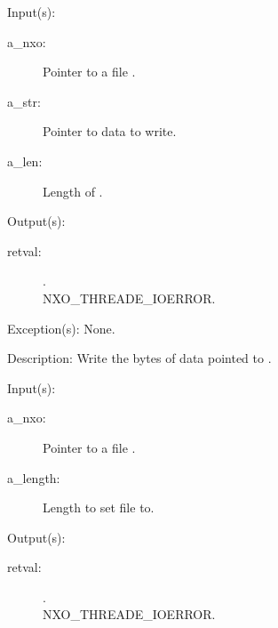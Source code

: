 \begin{capi}
\begin{capilist}
	\item[Input(s): ]
		\begin{description}\item[]
		\item[a\_nxo: ]
			Pointer to a file .
		\item[a\_str: ]
			Pointer to data to write.
		\item[a\_len: ]
			Length of .
		\end{description}
	\item[Output(s): ]
		\begin{description}\item[]
		\item[retval: ]
			\begin{description}\item[]
			\item[.]
			\item[
				{NXO_THREADE_IOERROR}.]
			\end{description}
		\end{description}
	\item[Exception(s): ] None.
	\item[Description: ]
		Write the  bytes of data pointed to .
	\end{capilist}
\label{nxo_file_truncate}
	\begin{capilist}
	\item[Input(s): ]
		\begin{description}\item[]
		\item[a\_nxo: ]
			Pointer to a file .
		\item[a\_length: ]
			Length to set file to.
		\end{description}
	\item[Output(s): ]
		\begin{description}\item[]
		\item[retval: ]
			\begin{description}\item[]
			\item[.]
			\item[
				{NXO_THREADE_IOERROR}.]

\end{description}
\end{description}
\end{capilist}
\end{capi}
